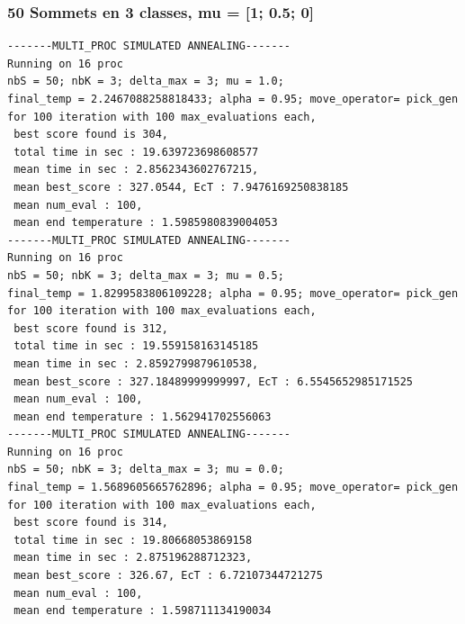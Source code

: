 \documentclass[a4paper]{article}
\begin{document}
\subsubsection{50 Sommets en 3 classes, mu = [1; 0.5; 0]}
\begin{verbatim}
-------MULTI_PROC SIMULATED ANNEALING-------
Running on 16 proc
nbS = 50; nbK = 3; delta_max = 3; mu = 1.0;
final_temp = 2.2467088258818433; alpha = 0.95; move_operator= pick_gen
for 100 iteration with 100 max_evaluations each, 
 best score found is 304,
 total time in sec : 19.639723698608577
 mean time in sec : 2.8562343602767215,
 mean best_score : 327.0544, EcT : 7.9476169250838185
 mean num_eval : 100,
 mean end temperature : 1.5985980839004053
-------MULTI_PROC SIMULATED ANNEALING-------
Running on 16 proc
nbS = 50; nbK = 3; delta_max = 3; mu = 0.5;
final_temp = 1.8299583806109228; alpha = 0.95; move_operator= pick_gen
for 100 iteration with 100 max_evaluations each, 
 best score found is 312,
 total time in sec : 19.559158163145185
 mean time in sec : 2.8592799879610538,
 mean best_score : 327.18489999999997, EcT : 6.5545652985171525
 mean num_eval : 100,
 mean end temperature : 1.562941702556063
-------MULTI_PROC SIMULATED ANNEALING-------
Running on 16 proc
nbS = 50; nbK = 3; delta_max = 3; mu = 0.0;
final_temp = 1.5689605665762896; alpha = 0.95; move_operator= pick_gen
for 100 iteration with 100 max_evaluations each, 
 best score found is 314,
 total time in sec : 19.80668053869158
 mean time in sec : 2.875196288712323,
 mean best_score : 326.67, EcT : 6.72107344721275
 mean num_eval : 100,
 mean end temperature : 1.598711134190034
\end{verbatim}
\end{document}
